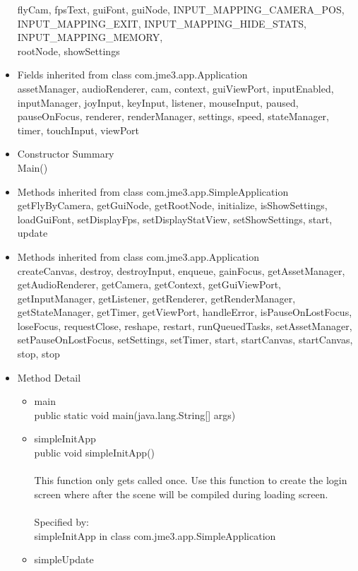 \documentclass[letterpaper]{article}
\begin{document}
\begin{itemize}
							flyCam, fpsText, guiFont, guiNode, INPUT\_MAPPING\_CAMERA\_POS, \\ INPUT\_MAPPING\_EXIT, INPUT\_MAPPING\_HIDE\_STATS, INPUT\_MAPPING\_MEMORY, \\ rootNode, showSettings
					\item	Fields inherited from class com.jme3.app.Application \\
							assetManager, audioRenderer, cam, context, guiViewPort, inputEnabled, inputManager, joyInput, keyInput, listener, mouseInput, paused, pauseOnFocus, renderer, renderManager, settings, speed, stateManager, timer, touchInput, viewPort
					\item	Constructor Summary \\
							Main()
					\item	Methods inherited from class com.jme3.app.SimpleApplication \\
							getFlyByCamera, getGuiNode, getRootNode, initialize, isShowSettings, loadGuiFont, setDisplayFps, setDisplayStatView, setShowSettings, start, update
					\item	Methods inherited from class com.jme3.app.Application \\
							createCanvas, destroy, destroyInput, enqueue, gainFocus, getAssetManager, getAudioRenderer, getCamera, getContext, getGuiViewPort, getInputManager, getListener, getRenderer, getRenderManager, getStateManager, getTimer, getViewPort, handleError, isPauseOnLostFocus, loseFocus, requestClose, reshape, restart, runQueuedTasks, setAssetManager, setPauseOnLostFocus, setSettings, setTimer, start, startCanvas, startCanvas, stop, stop
					\item	Method Detail
							\begin{itemize}
								\item	main \\
										public static void main(java.lang.String[] args)
								\item	simpleInitApp \\
										public void simpleInitApp() \\ \\
										This function only gets called once. Use this function to create the login screen where after the scene will be compiled during loading screen. \\ \\
										Specified by: \\
										simpleInitApp in class com.jme3.app.SimpleApplication
								\item	simpleUpdate \\

\end{itemize}
\end{itemize}
\end{document}
